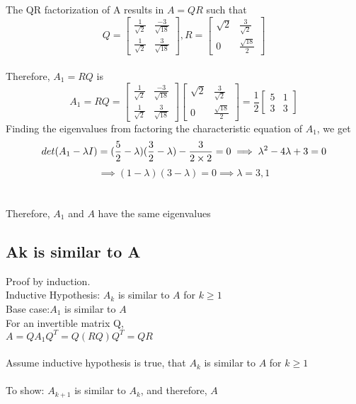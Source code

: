 \documentclass[12pt]{article}
\begin{document}
    The QR factorization of A results in $A = QR$ such that \\
    $$
    Q = \begin{bmatrix}
        \frac{1}{\sqrt{2}} & \frac{-3}{\sqrt{18}} \\
        \frac{1}{\sqrt{2}} & \frac{3}{\sqrt{18}} 
        \end{bmatrix},
    R = \begin{bmatrix}
        \sqrt{2} & \frac{3}{\sqrt{2}} \\
        0 & \frac{\sqrt{18}}{2} 
        \end{bmatrix}
    $$ \\
    Therefore, $A_1 = RQ$ is \\
    $$
    A_1 = RQ = 
    \begin{bmatrix}
        \frac{1}{\sqrt{2}} & \frac{-3}{\sqrt{18}} \\
        \frac{1}{\sqrt{2}} & \frac{3}{\sqrt{18}} 
    \end{bmatrix}
    \begin{bmatrix}
        \sqrt{2} & \frac{3}{\sqrt{2}} \\
        0 & \frac{\sqrt{18}}{2} 
    \end{bmatrix}
    = \frac{1}{2}
     \begin{bmatrix}
        5 & 1 \\
        3 & 3 
    \end{bmatrix}
    $$
    Finding the eigenvalues from factoring the characteristic equation of $A_1$, we get \\
    $$det(A_1 - \lambda I) = (\frac{5}{2} - \lambda)(\frac{3}{2} - \lambda) - \frac{3}{2 \times 2} = 0 \implies \lambda^2 -4\lambda +3 = 0  \\
    $$
    $$\implies (1 - \lambda)(3 - \lambda) = 0 \implies \lambda = 3,1$$ \\\\

    Therefore, $A_1$ and $A$ have the same eigenvalues


\subsection{Ak is similar to A}

Proof by induction. \\
Inductive Hypothesis: $A_k$ is similar to $A$ for $k \geq 1$ \\
Base case:$A_1$ is similar to $A$ \\
For an invertible matrix Q, \\
$A = QA_{1}Q^T = Q (RQ) Q^T = QR$ \\ \\
Assume inductive hypothesis is true, that $A_k$ is similar to $A$ for $k \geq 1$ \\ \\
To show: $A_{k+1}$ is similar to $A_k$, and therefore, $A$ \\
\end{document}
